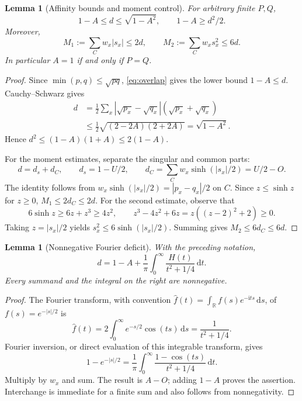 \documentclass[11pt]{article}
\newtheorem{lemma}[theorem]{Lemma}
\theoremstyle{definition}
\theoremstyle{remark}
\newcommand{\ii}{\mathrm i}
\newcommand{\dd}{\,\mathrm d}
\newcommand{\R}{\mathbb R}
\begin{document}
\begin{lemma}[Affinity bounds and moment control]
\label{lem:moments}
For arbitrary finite $P,Q$,
\begin{equation}
 1-A\le d\le\sqrt{1-A^2},\qquad 1-A\ge d^2/2.
 \label{eq:hellbounds}
\end{equation}
Moreover,
\begin{equation}
 M_1:=\sum_Cw_x|s_x|\le2d,
 \qquad
 M_2:=\sum_Cw_xs_x^2\le6d.
 \label{eq:moments}
\end{equation}
In particular $A=1$ if and only if $P=Q$.
\end{lemma}
\begin{proof}
Since $\min(p,q)\le\sqrt{pq}$, \eqref{eq:overlap} gives the lower bound $1-A\le d$. Cauchy--Schwarz gives
\begin{align*}
 d&=\frac12\sum_x|\sqrt{p_x}-\sqrt{q_x}|(\sqrt{p_x}+\sqrt{q_x})\\
 &\le\frac12\sqrt{(2-2A)(2+2A)}=\sqrt{1-A^2}.
\end{align*}
Hence $d^2\le(1-A)(1+A)\le2(1-A)$.

For the moment estimates, separate the singular and common parts:
\begin{equation}
 d=d_s+d_C,\qquad
 d_s=1-U/2,\qquad
 d_C=\sum_Cw_x\sinh(|s_x|/2)=U/2-O.
 \label{eq:decomp}
\end{equation}
The identity follows from $w_x\sinh(|s_x|/2)=|p_x-q_x|/2$ on $C$. Since $z\le\sinh z$ for $z\ge0$, $M_1\le2d_C\le2d$. For the second estimate, observe that
\[
 6\sinh z\ge6z+z^3\ge4z^2,
 \qquad z^3-4z^2+6z=z((z-2)^2+2)\ge0.
\]
Taking $z=|s_x|/2$ yields $s_x^2\le6\sinh(|s_x|/2)$. Summing gives $M_2\le6d_C\le6d$.
\end{proof}

\begin{lemma}[Nonnegative Fourier deficit]
\label{lem:fourier}
With the preceding notation,
\begin{equation}
 d=1-A+\frac1\pi\int_0^\infty
       \frac{H(t)}{t^2+1/4}\dd t.
 \label{eq:nonnegative}
\end{equation}
Every summand and the integral on the right are nonnegative.
\end{lemma}
\begin{proof}
The Fourier transform, with convention $\widehat f(t)=\int_{\R}f(s)e^{-\ii ts}\dd s$, of $f(s)=e^{-|s|/2}$ is
\[
 \widehat f(t)=2\int_0^\infty e^{-s/2}\cos(ts)\dd s
             =\frac1{t^2+1/4}.
\]
Fourier inversion, or direct evaluation of this integrable transform, gives
\[
 1-e^{-|s|/2}=\frac1\pi\int_0^\infty
      \frac{1-\cos(ts)}{t^2+1/4}\dd t.
\]
Multiply by $w_x$ and sum. The result is $A-O$; adding $1-A$ proves the assertion. Interchange is immediate for a finite sum and also follows from nonnegativity.
\end{proof}
\end{document}
